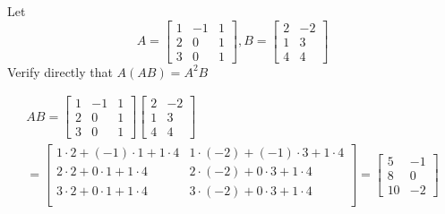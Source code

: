 \documentclass[a4paper, 11pt]{article}
\begin{document}
\begin{problem} 
Let
\[
    A = \left[\begin{array}{ccc}
            1 & -1 & 1 \\
            2 & 0  & 1 \\
            3 & 0  & 1
        \end{array}\right],
    B = \left[\begin{array}{cc}
            2 & -2 \\
            1 & 3  \\
            4 & 4
        \end{array}\right]
\]
Verify directly that \(A(AB) = A^2B\)
\end{problem}
\begin{solution}

    \begin{multline*}
        AB = \left[\begin{array}{ccc}
                1 & -1 & 1 \\
                2 & 0  & 1 \\
                3 & 0  & 1
            \end{array}\right]\left[\begin{array}{cc}
                2 & -2 \\
                1 & 3  \\
                4 & 4
            \end{array}\right]
        \\
        = \left[\begin{array}{cc}
                1 \cdot 2 + (-1) \cdot 1 + 1 \cdot 4 & 1 \cdot (-2) + (-1) \cdot 3 + 1 \cdot 4 \\
                2 \cdot 2 + 0 \cdot 1 + 1 \cdot 4    & 2 \cdot (-2) + 0 \cdot 3 + 1 \cdot 4    \\
                3 \cdot 2 + 0 \cdot 1 + 1 \cdot 4    & 3 \cdot (-2) + 0 \cdot 3 + 1 \cdot 4    \\
            \end{array}\right]
        = \left[\begin{array}{cc}
                5  & -1 \\
                8  & 0  \\
                10 & -2
            \end{array}\right]
    \end{multline*}


\end{solution}
\end{document}
